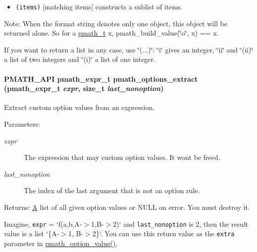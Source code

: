 \begin{itemize}
\item {\tt (items)} \mbox{[}matching items\mbox{]} constructs a sublist of items.\end{itemize}


\begin{Desc}
\item[Note:]When the format string denotes only one object, this object will be returned alone. So for a \hyperlink{classpmath__t}{pmath\_\-t} x, pmath\_\-build\_\-value(\char`\"{}o\char`\"{}, x) == x. \par
 If you want to return a list in any case, use \char`\"{}(...)\char`\"{}: \char`\"{}i\char`\"{} gives an integer, \char`\"{}ii\char`\"{} and \char`\"{}(ii)\char`\"{} a list of two integers and \char`\"{}(i)\char`\"{} a list of one integer. \end{Desc}
\hypertarget{group__helpers_g24403dfbd825b17fc4c6da5973922184}{
\paragraph[{pmath\_\-options\_\-extract}]{\setlength{\rightskip}{0pt plus 5cm}PMATH\_\-API {\bf pmath\_\-expr\_\-t} pmath\_\-options\_\-extract ({\bf pmath\_\-expr\_\-t} {\em expr}, \/  size\_\-t {\em last\_\-nonoption})}\hfill}
\label{group__helpers_g24403dfbd825b17fc4c6da5973922184}


Extract custom option values from an expression. 

\begin{Desc}
\item[Parameters:]
\begin{description}
\item[{\em expr}]The expression that may custom option values. It wont be freed. \item[{\em last\_\-nonoption}]The index of the last argument that is not an option rule. \end{description}
\end{Desc}
\begin{Desc}
\item[Returns:]\hyperlink{class_a}{A} list of all given option values or NULL on error. You must destroy it.\end{Desc}
Imagine, {\tt expr} = `f(a,b,A-$>$1,B-$>$2)` and {\tt last\_\-nonoption} is 2, then the result value is a list `\{A-$>$1, B-$>$2\}`. You can use this return value as the {\tt extra} parameter in \hyperlink{group__helpers_gc244ab0720278b396976728a39f8bde6}{pmath\_\-option\_\-value()}.


